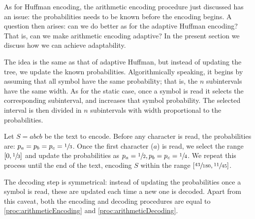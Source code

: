 \documentclass{subfiles}
\begin{document}
    As for Huffman encoding, the arithmetic encoding procedure just discussed
        has an issue: the probabilities needs to be known before the encoding begins.
        A question then arises: can we do better as for the adaptive Huffman encoding?
        That is, can we make arithmetic encoding adaptive? 
        In the present section we discuss how we can achieve adaptability.

    The idea is the same as that of adaptive Huffman, but instead of 
        updating the tree, we update the known probabilities.
        Algorithmically speaking, it begins by assuming that all symbol have the same probability;
        that is, the \(n\) subintervals have the same width.
        As for the static case, once a symbol is read it selects the corresponding subinterval,
        and increases that symbol probability. The selected 
        interval is then divided in \(n\) subintervals with width proportional to the probabilities.

    \begin{example*}
        Let \(S = abcb\) be the text to encode. 
            Before any character is read, the probabilities are: \(p_{a} = p_{b}
                = p_{c} = \sfrac{1}{3}\).
        Once the first character (\(a\)) is read, we select the range \([0, \sfrac{1}{3}]\)
        and update the probabilities as \(p_{a} = \sfrac{1}{2}, p_{b} = p_{c} = \sfrac{1}{4}\).
        We repeat this process until the end of the text, 
        encoding \(S\) within the range \([\sfrac{43}{180}, \sfrac{11}{45}]\).
                
    \end{example*}

    The decoding step is symmetrical: instead of updating the probabilities once a 
        symbol is read, these are updated each time a new one is decoded.
        Apart from this caveat, both the encoding and decoding procedures 
        are equal to \autoref{proc:arithmeticEncoding} and \autoref{proc:arithmeticDecoding}.    
\end{document}
